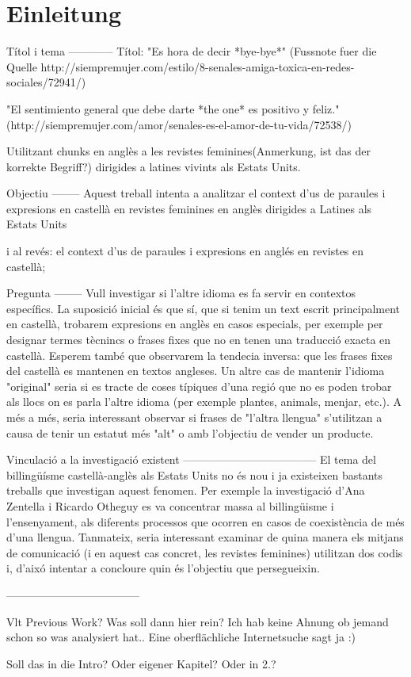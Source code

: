\section{Einleitung}

\begin{comment}
* ca 3/4 Seiten
* Untersuchungsgegenstand
* Erkenntnisinteresse
* Forschungsstand
* Vorgehensweise: also Section 2 macht blabla, Section 3 blablup, ....
* Ergebnisse können/sollen angedeuten werden
\end{comment}

Títol i tema
------------
Títol:
"Es hora de decir *bye-bye*" (Fussnote fuer die Quelle http://siempremujer.com/estilo/8-senales-amiga-toxica-en-redes-sociales/72941/)

"El sentimiento general que debe darte *the one* es positivo y feliz." (http://siempremujer.com/amor/senales-es-el-amor-de-tu-vida/72538/)

Utilitzant chunks en anglès a les revistes feminines(Anmerkung, ist das der korrekte Begriff?) dirigides a latines vivints als Estats Units.


Objectiu
--------
Aquest treball intenta a analitzar el context d'us de paraules i expresions en castellà en revistes feminines en anglès dirigides a Latines als Estats Units

i al revés:
el context d'us de paraules i expresions en anglés en revistes en castellà;


Pregunta
--------
Vull investigar si l'altre idioma es fa servir en contextos específics.
La suposició inicial és que sí, que si tenim un text escrit principalment en castellà, trobarem expresions en anglès en casos especials,
per exemple per designar termes tècnincs o frases fixes que no en tenen una traducció exacta en castellà.
Esperem també que observarem la tendecia inversa: que les frases fixes del castellà es mantenen en textos angleses.
Un altre cas de mantenir l'idioma "original" seria si es tracte de coses típiques d'una regió que no es poden trobar als llocs on es parla l'altre idioma (per exemple plantes, animals, menjar, etc.).
A més a més, seria interessant observar si frases de "l'altra llengua" s'utilitzan a causa de tenir un estatut més "alt" o amb l'objectiu de vender un producte.


Vinculació a la investigació existent
------------------------------------
El tema del billingüísme castellà-anglès als Estats Units no és nou i ja existeixen bastants treballs que investigan aquest fenomen.
Per exemple la investigació d'Ana Zentella i Ricardo Otheguy es va concentrar massa al billingüisme i l'ensenyament,
als diferents processos que ocorren en casos de coexistència de més d'una llengua.
Tanmateix, seria interessant examinar de quina manera els mitjans de comunicació (i en aquest cas concret, les revistes feminines) utilitzan dos codis i,
d'aixó intentar a concloure quin és l'objectiu que persegueixin.

------------------------------------

Vlt Previous Work?
Was soll dann hier rein?
Ich hab keine Ahnung ob jemand schon so was analysiert hat..
Eine oberflächliche Internetsuche sagt ja :)

Soll das in die Intro? Oder eigener Kapitel? Oder in 2.?

